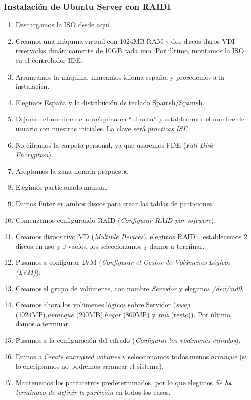 \documentclass[12pt,spanish]{article}
\begin{document}
\subsubsection{Instalación de Ubuntu Server con RAID1}
\begin{enumerate}
  \item Descargamos la ISO desde \href{http://atcproyectos.ugr.es/esriie/ubuntu-16.04.5-server-amd64.iso}{aquí}.
  \item Creamos una máquina virtual con 1024MB RAM y dos discos duros VDI reservados dinámicamente de 10GB cada uno. Por último, montamos la ISO en el controlador IDE.
  \item  Arrancamos la máquina, marcamos idioma español y procedemos a la instalación.
  \item Elegimos España y la distribución de teclado Spanish/Spanish.
	\item Dejamos el nombre de la máquina en ``ubuntu'' y establecemos el nombre de usuario con nuestras iniciales. La clave será \textit{practicas,ISE}.
	\item No ciframos la carpeta personal, ya que usaremos FDE (\textit{Full Disk Encryption}).
	\item Aceptamos la zona horaria propuesta.
	\item Elegimos particionado manual.
	\item Damos Enter en ambos discos para crear las tablas de particiones.
	\item Comenzamos configurando RAID (\textit{Configurar RAID por software}).
	\item Creamos dispositivo MD (\textit{Multiple Devices}), elegimos RAID1, establecemos 2 discos en uso y 0 vacíos, los seleccionamos y damos a terminar.
	\item Pasamos a configurar LVM (\textit{Configurar el Gestor de Volúmenes Lógicos (LVM)}).
	\item Creamos el grupo de volúmenes, con nombre \textit{Servidor} y elegimos \textit{/dev/md0}.
	\item Creamos ahora los volúmenes lógicos sobre Servidor (\textit{swap} (1024MB),\textit{arranque} (200MB),\textit{hogar} (800MB) y \textit{raíz} (resto)). Por último, damos a terminar.
	\item Pasamos a la configuración del cifrado (\textit{Configurar los volúmenes cifrados}).
	\item Damos a \textit{Create encrypted volumes} y seleccionamos todos menos \textit{arranque} (si lo encriptamos no podremos arrancar el sistema).
	\item Mantenemos los parámetros predeterminados, por lo que elegimos \textit{Se ha terminado de definir la partición} en todos los casos.

\end{enumerate}
\end{document}
